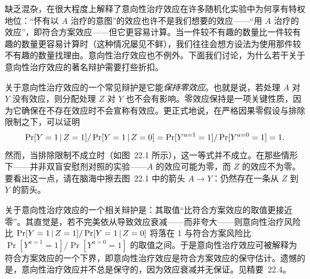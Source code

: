 缺乏混杂，在很大程度上解释了意向性治疗效应在许多随机化实验中为何享有特权地位：“怀有以 $A$ 治疗的意图”的效应也许不是我们想要的效应——“用 $A$ 治疗的效应”，即符合方案效应——但它更容易计算。当一件较不有趣的数量比一件较有趣的数量更容易计算时（这种情况屡见不鲜），我们往往会想方设法为使用那件较不有趣的数量找理由。意向性治疗效应也不例外。下面我们讨论，为什么若干关于意向性治疗效应的著名辩护需要打些折扣。

关于意向性治疗效应的一个常见辩护是它能\emph{保持零效应}。也就是说，若处理 $A$ 对 $Y$ 没有效应，则分配处理 $Z$ 对 $Y$ 也不会有影响。零效应保持是一项关键性质，因为它确保在不存在效应时不会宣称有效应。更正式地说，在严格因果零假设与排除限制之下，可以证明
\[
\Pr[Y=1\,|\, Z=1]/\Pr[Y=1\,|\, Z=0]=\Pr[Y^{a=1}=1]/\Pr[Y^{a=0}=1]=1.
\]
然而，当排除限制不成立时（如图~22.1 所示），这一等式并不成立。在那些情形下——并非双盲安慰剂对照的实验——$A$ 的效应可能为零，而 $Z$ 的效应不为零。要看出这一点，请在脑海中擦去图~22.1 中的箭头 $A\to Y$：仍然存在一条从 $Z$ 到 $Y$ 的箭头。

关于意向性治疗效应的一个相关辩护是：其取值“比符合方案效应的取值更接近零”。其直觉是，若不完美依从导致效应衰减——而非夸大——则意向性治疗风险比 $\Pr[Y=1\,|\, Z=1]/\Pr[Y=1\,|\, Z=0]$ 将落在 1 与符合方案风险比 $\Pr[Y^{a=1}=1]/\Pr[Y^{a=0}=1]$ 的取值之间。于是意向性治疗效应可被解释为符合方案效应的一个下界，即意向性治疗效应是符合方案效应的保守估计。遗憾的是，意向性治疗效应并不总是保守的，因为效应衰减并无保证。见精要~22.4。


